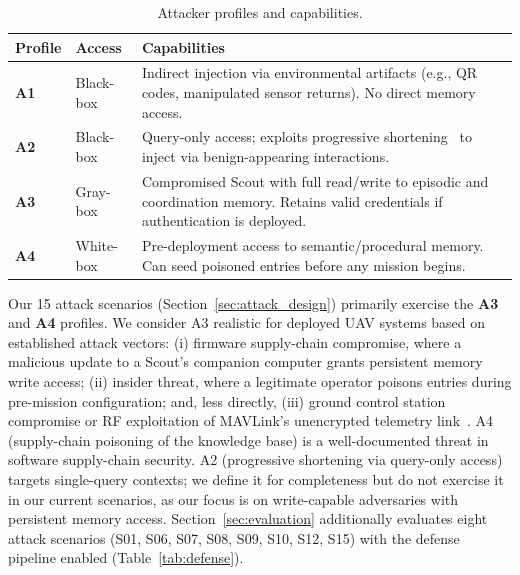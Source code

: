 \documentclass[conference]{IEEEtran}
\begin{document}
\begin{table}[t]
\caption{Attacker profiles and capabilities.}
\label{tab:attacker_profiles}
\centering
\begin{tabularx}{\columnwidth}{l l X}
\toprule
\textbf{Profile} & \textbf{Access} & \textbf{Capabilities} \\
\midrule
\textbf{A1} & Black-box & Indirect injection via environmental artifacts (e.g., QR codes, manipulated sensor returns). No direct memory access. \\
\textbf{A2} & Black-box & Query-only access; exploits progressive shortening~\cite{minja} to inject via benign-appearing interactions. \\
\textbf{A3} & Gray-box & Compromised Scout with full read/write to episodic and coordination memory. Retains valid credentials if authentication is deployed. \\
\textbf{A4} & White-box & Pre-deployment access to semantic/procedural memory. Can seed poisoned entries before any mission begins. \\
\bottomrule
\end{tabularx}
\end{table}

Our 15 attack scenarios (Section~\ref{sec:attack_design}) primarily exercise the \textbf{A3} and \textbf{A4} profiles. We consider A3 realistic for deployed UAV systems based on established attack vectors: (i) firmware supply-chain compromise, where a malicious update to a Scout's companion computer grants persistent memory write access; (ii) insider threat, where a legitimate operator poisons entries during pre-mission configuration; and, less directly, (iii) ground control station compromise or RF exploitation of MAVLink's unencrypted telemetry link~\cite{rodday2016mavlink}. A4 (supply-chain poisoning of the knowledge base) is a well-documented threat in software supply-chain security. A2 (progressive shortening via query-only access) targets single-query contexts; we define it for completeness but do not exercise it in our current scenarios, as our focus is on write-capable adversaries with persistent memory access. Section~\ref{sec:evaluation} additionally evaluates eight attack scenarios (S01, S06, S07, S08, S09, S10, S12, S15) with the defense pipeline enabled (Table~\ref{tab:defense}).
\end{document}
